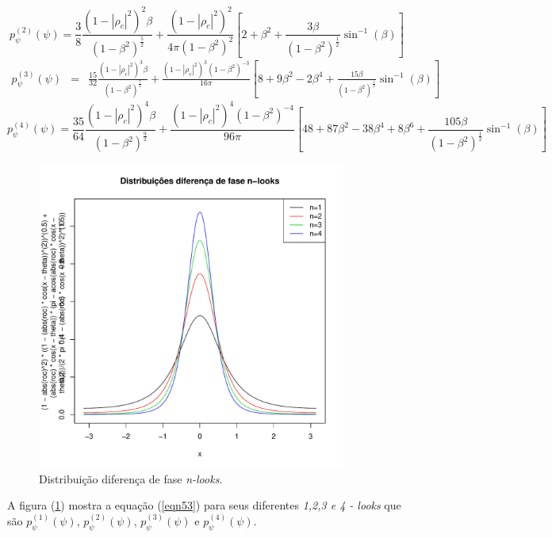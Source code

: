 \documentclass[12pt,a4paper]{article}
\begin{document}
\begin{equation}\label{eqn56}
	p_{\psi}^{(2)}(\psi)=\frac{3}{8}\frac{(1-|\rho_c|^2)^2\beta}{(1-\beta^2)^{\frac{5}{2}}}+\frac{(1-|\rho_c|^2)^2}{4\pi(1-\beta^2)^{2}}\left[2+\beta^2+\frac{3\beta}{(1-\beta^2)^{\frac{1}{2}}}\sin^{-1}(\beta)\right]
\end{equation}
\begin{equation}\label{eqn57}
\begin{array}{ccc}
	p_{\psi}^{(3)}(\psi)&=&\frac{15}{32}\frac{(1-|\rho_c|^2)^3\beta}{(1-\beta^2)^{\frac{7}{2}}}+\frac{(1-|\rho_c|^2)^3(1-\beta^2)^{-3}}{16\pi}\left[8+9\beta^2-2\beta^4+\frac{15\beta}{(1-\beta^2)^{\frac{1}{2}}}\sin^{-1}(\beta)\right]
\end{array}
\end{equation}
\begin{equation}\label{eqn58}
	p_{\psi}^{(4)}(\psi)=\frac{35}{64}\frac{(1-|\rho_c|^2)^4\beta}{(1-\beta^2)^{\frac{9}{2}}}+\frac{(1-|\rho_c|^2)^4(1-\beta^2)^{-4}}{96\pi}\left[48+87\beta^2-38\beta^4+8\beta^6+\frac{105\beta}{(1-\beta^2)^{\frac{1}{2}}}\sin^{-1}(\beta)\right]
\end{equation}

\begin{figure}[hbt]
\centering
\includegraphics[width=4.0in]{fig1_eq_18_lee_1994.pdf}
	\caption{Distribuição diferença de fase {\it n-looks}.}
\label{fig1}
\end{figure}

A  figura (\ref{fig1}) mostra a equação (\ref{eqn53}) para seus diferentes {\it 1,2,3 e 4 - looks} que são $p_{\psi}^{(1)}(\psi)$, $p_{\psi}^{(2)}(\psi)$, $p_{\psi}^{(3)}(\psi)$ e $p_{\psi}^{(4)}(\psi)$.
\end{document}
